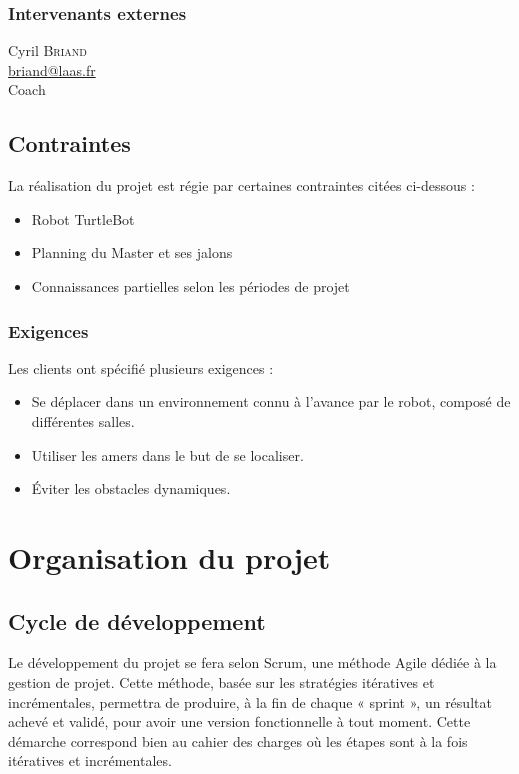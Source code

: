 \documentclass[10pt,a4paper]{article}
\begin{document}
\subsubsection{Intervenants externes}
\begin{minipage}[t]{0.46\textwidth} 
Cyril \textsc{Briand} \\
\href{mailto:briand@laas.fr}{briand@laas.fr} \\
Coach
\end{minipage} 

\subsection{Contraintes}
\noindent La réalisation du projet est régie par certaines contraintes citées ci-dessous : 
\begin{itemize}
\item Robot TurtleBot
\item Planning du Master et ses jalons 
\item Connaissances partielles selon les périodes de projet
\end{itemize} 

\subsubsection{Exigences}
Les clients ont spécifié plusieurs exigences :
\begin{itemize}
\item Se déplacer dans un environnement connu à l'avance par le robot, composé de différentes salles.
\item Utiliser les amers dans le but de se localiser.
\item Éviter les obstacles dynamiques.
\end{itemize} 



\newpage
\section{Organisation du projet}
\label{sec:organisation}

\subsection{Cycle de développement}

Le développement du projet se fera selon Scrum, une méthode Agile dédiée à la gestion de projet. Cette méthode, basée sur les stratégies itératives et incrémentales, permettra de produire, à la fin de chaque « sprint », un résultat achevé et validé, pour avoir une version fonctionnelle à tout moment. Cette démarche correspond bien au cahier des charges où les étapes sont à la fois itératives et incrémentales.
\end{document}

